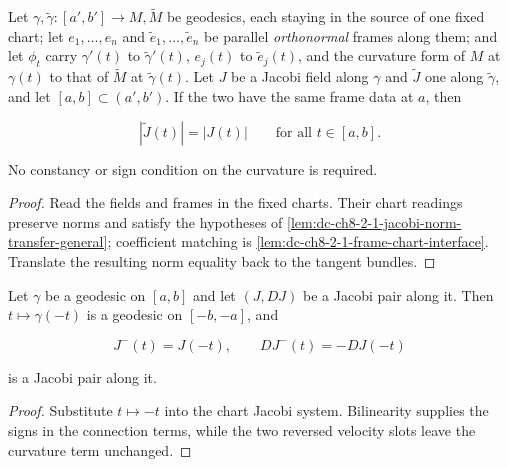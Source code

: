 \begin{lemma}
  \label{lem:dc-ch8-2-1-jacobi-norm-transfer-manifold}


  Let $\gamma,\tilde\gamma:[a',b']\to M,\tilde M$ be geodesics, each staying in the source of
  one fixed chart; let $e_1,\dots,e_n$ and $\tilde e_1,\dots,\tilde e_n$ be parallel
  \emph{orthonormal} frames along them; and let $\phi_t$ carry $\gamma'(t)$ to
  $\tilde\gamma'(t)$, $e_j(t)$ to $\tilde e_j(t)$, and the curvature form of $M$ at
  $\gamma(t)$ to that of $\tilde M$ at $\tilde\gamma(t)$. Let $J$ be
  a Jacobi field along $\gamma$ and $\tilde J$ one along $\tilde\gamma$, and let
  $[a,b]\subset(a',b')$. If the two have the same frame data at $a$, then

  $$
  |\tilde J(t)|=|J(t)|\qquad\text{for all }t\in[a,b] .
  $$

  No constancy or sign condition on the curvature is required.
\end{lemma}
\begin{proof}

\sketch
  Read the fields and frames in the fixed charts. Their chart readings preserve norms and
  satisfy the hypotheses of \cref{lem:dc-ch8-2-1-jacobi-norm-transfer-general}; coefficient
  matching is \cref{lem:dc-ch8-2-1-frame-chart-interface}. Translate the resulting norm
  equality back to the tangent bundles.
\end{proof}

\begin{lemma}
  \label{lem:dc-ch8-2-1-jacobi-reversal}


  Let $\gamma$ be a geodesic on $[a,b]$ and let $(J,DJ)$ be a Jacobi pair along it. Then
  $t\mapsto\gamma(-t)$ is a geodesic on $[-b,-a]$, and

  $$
  J^-(t)=J(-t),\qquad DJ^-(t)=-DJ(-t)
  $$

  is a Jacobi pair along it.
\end{lemma}
\begin{proof}

\sketch
  Substitute $t\mapsto-t$ into the chart Jacobi system. Bilinearity supplies the signs in
  the connection terms, while the two reversed velocity slots leave the curvature term
  unchanged.
\end{proof}

